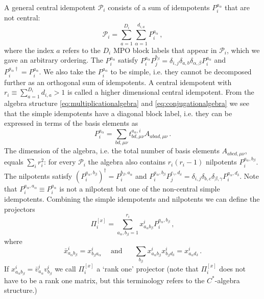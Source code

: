 \documentclass[12 pt]{article}
\begin{document}
A general central idempotent $\mathcal{P}_i$ consists of a sum of idempotents $P^{a_\alpha}_i$ that are not central:
\begin{equation}\label{eq:centralidempotentdecomposition}
    \mathcal{P}_i = \sum_{a=1}^{D_i}\sum_{\alpha = 1}^{d_{i,a}} P^{a_\alpha}_i\, ,
\end{equation}
where the index $a$ refers to the $D_i$ MPO block labels that appear in $\mathcal{P}_i$, which we gave an arbitrary ordering. The $P^{a_\alpha}_i$ satisfy $P^{a_\alpha}_iP^{b_\beta}_j = \delta_{i,j}\delta_{a,b}\delta_{\alpha,\beta}P^{a_\alpha}_i$ and $P^{a_\alpha\dagger}_i = P_i^{a_\alpha}$. We also take the $P_i^{a_\alpha}$ to be simple, i.e. they cannot be decomposed further as an orthogonal sum of idempotents. A central idempotent with $r_i \equiv \sum_{a=1}^{D_i}d_{i,a} > 1$ is called a higher dimensional central idempotent. From the algebra structure \eqref{eq:multiplicationalgebra} and \eqref{eq:conjugationalgebra} we see that the simple idempotents have a diagonal block label, i.e. they can be expressed in terms of the basis elements as
\begin{equation}
    P^{a_\alpha}_i = \sum_{bd,\mu\nu} t^{a_\alpha,i}_{bd,\mu\nu}A_{abad,\mu\nu}\, .
\end{equation}
The dimension of the algebra, i.e. the total number of basis elements $A_{abcd,\mu\nu}$, equals $\sum_i r_i^2$: for every $\mathcal{P}_i$ the algebra also contains $r_i(r_i - 1)$ nilpotents $P^{a_\alpha,b_\beta}_i$. The nilpotents satisfy $\left(P_i^{a_\alpha,b_\beta}\right)^\dagger = P_i^{b_\beta,a_\alpha}$ and $P_i^{a_\alpha,b_\beta}P_j^{c_\gamma,d_\delta} = \delta_{i,j} \delta_{b,c}\delta_{\beta,\gamma}P_i^{a_\alpha,d_\delta}$. Note that $P^{a_\alpha,a_\alpha}_i \equiv P^{a_\alpha}_i$ is not a nilpotent but one of the non-central simple idempotents. Combining the simple idempotents and nilpotents we can define the projectors
\begin{equation}
    \Pi_i^{[x]} = \sum_{a_\alpha,b_\beta = 1}^{r_i}  x^i_{a_\alpha b_\beta} P_i^{a_\alpha,b_\beta}\, ,
\end{equation}
where
\begin{equation}
    \bar{x}^i_{a_\alpha b_\beta} = x^i_{b_\beta a_\alpha}\,\;\;\;\;\text{and }\;\;\;\;\; \sum_{b_\beta} x^i_{a_\alpha b_\beta}x^i_{b_\beta d_\delta} = x^i_{a_\alpha d_\delta}\, .
\end{equation}
If $x^i_{a_\alpha b_\beta} = \bar{v}^i_{a_\alpha}v^i_{b_\beta}$ we call $\Pi^{[x]}_i$ a `rank one' projector (note that $\Pi_i^{[x]}$ does not have to be a rank one matrix, but this terminology refers to the $C^*$-algebra structure.)
\end{document}
